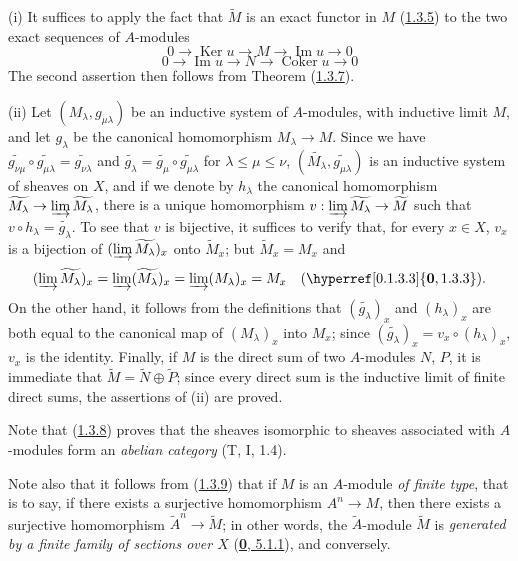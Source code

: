 (i) It suffices to apply the fact that $\widetilde{M}$ is an exact functor in
$M$ (\hyperref[I.1.3.5]{1.3.5}) to the two exact sequences of $A$-modules
\[
  0\to\operatorname{Ker}u\to M\to\operatorname{Im}u\to0
\]
\[
  0\to\operatorname{Im}u\to N\to\operatorname{Coker}u\to0
\]
The second assertion then follows from Theorem
(\hyperref[I.1.3.7]{1.3.7}).

(ii) Let $(M_\lambda,g_{\mu\lambda})$ be an inductive system of $A$-modules,
with inductive limit $M$, and let $g_\lambda$ be the canonical homomorphism
$M_\lambda\to M$. Since we have
$\widetilde{g_{\nu\mu}}\circ\widetilde{g_{\mu\lambda}}
=\widetilde{g_{\nu\lambda}}$ and
$\widetilde{g_\lambda}=\widetilde{g_\mu}\circ
\widetilde{g_{\mu\lambda}}$ for $\lambda\leq\mu\leq\nu$,
$(\widetilde{M_\lambda},\widetilde{g_{\mu\lambda}})$ is an inductive
system of sheaves on $X$, and if we denote by $h_\lambda$
the canonical homomorphism
$\widetilde{M_\lambda}\to\varinjlim\widetilde{M_\lambda}$, there is a
unique homomorphism
$v:\varinjlim\widetilde{M_\lambda}\to\widetilde{M}$ such that
$v\circ h_\lambda=\widetilde{g_\lambda}$. To see that $v$ is bijective, it
suffices to verify that, for every $x\in X$, $v_x$ is a bijection of
$(\varinjlim\widetilde{M_\lambda})_x$ onto $\widetilde{M}_x$; but
$\widetilde{M}_x=M_x$ and
\[
  (\varinjlim\widetilde{M_\lambda})_x
  =\varinjlim(\widetilde{M_\lambda})_x
  =\varinjlim(M_\lambda)_x=M_x
  \quad(\hyperref[0.1.3.3]{\textbf{0}, 1.3.3}).
\]
On the other hand, it follows from the definitions that
$(\widetilde{g_\lambda})_x$ and $(h_\lambda)_x$ are both equal to the
canonical map of $(M_\lambda)_x$ into $M_x$; since
$(\widetilde{g_\lambda})_x=v_x\circ(h_\lambda)_x$, $v_x$ is the identity.
Finally, if $M$ is the direct sum of two $A$-modules $N$, $P$, it is
immediate that $\widetilde{M}=\widetilde{N}\oplus\widetilde{P}$; since every
direct sum is the inductive limit of finite direct sums, the assertions of
(ii) are proved.

Note that (\hyperref[I.1.3.8]{1.3.8}) proves that the sheaves
isomorphic to sheaves associated with $A$-modules form an
\emph{abelian category} (T, I, 1.4).

Note also that it follows from (\hyperref[I.1.3.9]{1.3.9}) that if $M$
is an $A$-module \emph{of finite type}, that is to say, if there exists a
surjective homomorphism $A^n\to M$, then there exists a surjective
homomorphism $\widetilde{A}^n\to\widetilde{M}$; in other words, the
$\widetilde{A}$-module $\widetilde{M}$ is \emph{generated by a finite family
of sections over $X$} (\hyperref[0.5.1.1]{\textbf{0}, 5.1.1}), and conversely.

